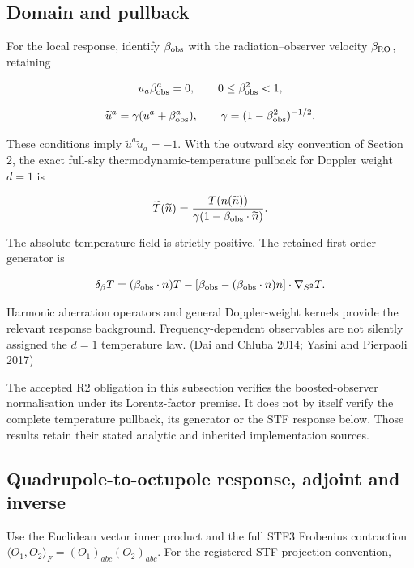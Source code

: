 \documentclass[
  11pt,
  a4paper]{article}
\begin{document}
\hypertarget{domain-and-pullback}{%
\subsection{Domain and pullback}\label{domain-and-pullback}}

For the local response, identify \(\beta_{\rm obs}\) with the radiation--observer velocity \(\beta_{\rm RO}\), retaining

\[
u_a\beta_{\rm obs}^a=0,\qquad
0\le\beta_{\rm obs}^2<1,
\]

\[
\widetilde u^a=\gamma(u^a+\beta_{\rm obs}^a),
\qquad \gamma=(1-\beta_{\rm obs}^2)^{-1/2}.
\]

These conditions imply \(\widetilde u^a\widetilde u_a=-1\). With the outward sky convention of Section 2, the exact full-sky thermodynamic-temperature pullback for Doppler weight \(d=1\) is

\[
\widetilde T(\widetilde n)
=\frac{T(n(\widetilde n))}
{\gamma(1-\beta_{\rm obs}\cdot\widetilde n)}.
\]

The absolute-temperature field is strictly positive. The retained first-order generator is

\[
\delta_\beta T
=(\beta_{\rm obs}\cdot n)T
-[\beta_{\rm obs}-(\beta_{\rm obs}\cdot n)n]\cdot\nabla_{S^2}T.
\]

Harmonic aberration operators and general Doppler-weight kernels provide the relevant response background. Frequency-dependent observables are not silently assigned the \(d=1\) temperature law. (Dai and Chluba 2014; Yasini and Pierpaoli 2017)

The accepted R2 obligation in this subsection verifies the boosted-observer normalisation under its Lorentz-factor premise. It does not by itself verify the complete temperature pullback, its generator or the STF response below. Those results retain their stated analytic and inherited implementation sources.

\hypertarget{quadrupole-to-octupole-response-adjoint-and-inverse}{%
\subsection{Quadrupole-to-octupole response, adjoint and inverse}\label{quadrupole-to-octupole-response-adjoint-and-inverse}}

Use the Euclidean vector inner product and the full STF3 Frobenius contraction
\(\langle O_1,O_2\rangle_F=(O_1)_{abc}(O_2)_{abc}\). For the registered
STF projection convention,
\end{document}
